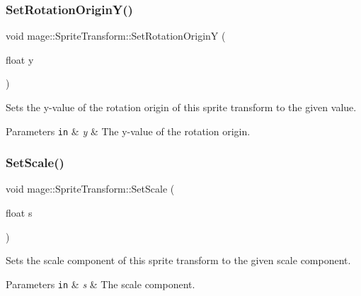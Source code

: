 \subsubsection{\texorpdfstring{Set\+Rotation\+Origin\+Y()}{SetRotationOriginY()}}
{\footnotesize\ttfamily void mage\+::\+Sprite\+Transform\+::\+Set\+Rotation\+OriginY (\begin{DoxyParamCaption}\item[{float}]{y }\end{DoxyParamCaption})\hspace{0.3cm}{\ttfamily [noexcept]}}

Sets the y-\/value of the rotation origin of this sprite transform to the given value.


\begin{DoxyParams}[1]{Parameters}
\mbox{\tt in}  & {\em y} & The y-\/value of the rotation origin. \\
\hline
\end{DoxyParams}
\hypertarget{structmage_1_1_sprite_transform_adb044fea32dd1a279a51728d38f50300}{}\label{structmage_1_1_sprite_transform_adb044fea32dd1a279a51728d38f50300} 
\subsubsection{\texorpdfstring{Set\+Scale()}{SetScale()}\hspace{0.1cm}{\footnotesize\ttfamily [1/4]}}
{\footnotesize\ttfamily void mage\+::\+Sprite\+Transform\+::\+Set\+Scale (\begin{DoxyParamCaption}\item[{float}]{s }\end{DoxyParamCaption})\hspace{0.3cm}{\ttfamily [noexcept]}}

Sets the scale component of this sprite transform to the given scale component.


\begin{DoxyParams}[1]{Parameters}
\mbox{\tt in}  & {\em s} & The scale component. \\
\hline
\end{DoxyParams}
\hypertarget{structmage_1_1_sprite_transform_a43e07fe0f5bb995625e2733cb7b4673f}{}\label{structmage_1_1_sprite_transform_a43e07fe0f5bb995625e2733cb7b4673f} 
